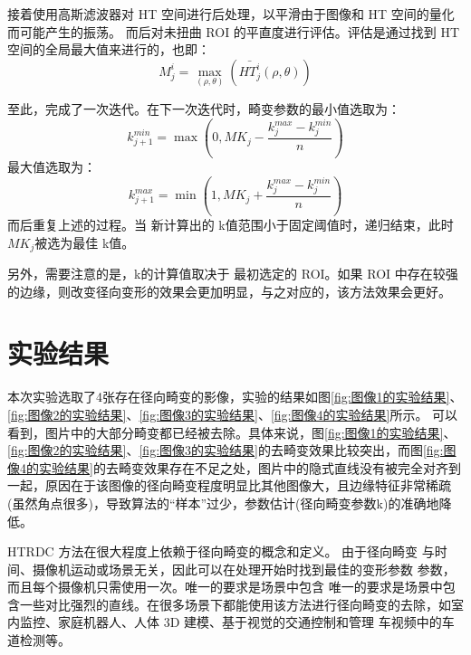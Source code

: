 \documentclass[12pt, onecolumn]{article}
\newcommand\normf{\fangsong}
\begin{document}
	接着使用高斯滤波器对 HT 空间进行后处理，以平滑由于图像和 HT 空间的量化而可能产生的振荡。
	而后对未扭曲 ROI 的平直度进行评估。评估是通过找到 HT 空间的全局最大值来进行的，也即：
	\begin{equation}
	M^i_j=\max_{(\rho,\theta)}\left(\bar{HT^i_j}( \rho,\theta) \right) 
	\end{equation}
	
	至此，完成了一次迭代。在下一次迭代时，畸变参数的最小值选取为：
	\begin{equation}
	k^{min}_{j+1}=\max\left(0,MK_j-\frac{k^{max}_{j}-k^{min}_{j}}{n} \right) 
	\end{equation}
	最大值选取为：
	\begin{equation}
	k^{max}_{j+1}=\min\left(1,MK_j+\frac{k^{max}_{j}-k^{min}_{j}}{n} \right) 
	\end{equation}
	而后重复上述的过程。当 新计算出的 k值范围小于固定阈值时，递归结束，此时$MK_j$被选为最佳 k值。
	
	另外，需要注意的是，k的计算值取决于
	最初选定的 ROI。如果 ROI 中存在较强的边缘，则改变径向变形的效果会更加明显，与之对应的，该方法效果会更好。
	
	\section{\normf 实验结果}
	本次实验选取了4张存在径向畸变的影像，实验的结果如图\ref{fig:图像1的实验结果}、\ref{fig:图像2的实验结果}、\ref{fig:图像3的实验结果}、\ref{fig:图像4的实验结果}所示。
	可以看到，图片中的大部分畸变都已经被去除。具体来说，图\ref{fig:图像1的实验结果}、\ref{fig:图像2的实验结果}、\ref{fig:图像3的实验结果}的去畸变效果比较突出，而图\ref{fig:图像4的实验结果}的去畸变效果存在不足之处，图片中的隐式直线没有被完全对齐到一起，原因在于该图像的径向畸变程度明显比其他图像大，且边缘特征非常稀疏(虽然角点很多)，导致算法的“样本”过少，参数估计(径向畸变参数k)的准确地降低。
	
	HTRDC 方法在很大程度上依赖于径向畸变的概念和定义。
	由于径向畸变
	与时间、摄像机运动或场景无关，因此可以在处理开始时找到最佳的变形参数
	参数，而且每个摄像机只需使用一次。唯一的要求是场景中包含
	唯一的要求是场景中包含一些对比强烈的直线。在很多场景下都能使用该方法进行径向畸变的去除，如室内监控、家庭机器人、人体 3D 建模、基于视觉的交通控制和管理
	车视频中的车道检测等。
	
\end{document}
